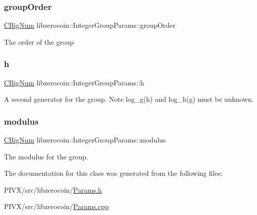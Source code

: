 \subsubsection{\texorpdfstring{group\+Order}{groupOrder}}
{\footnotesize\ttfamily \mbox{\hyperlink{class_c_big_num}{C\+Big\+Num}} libzerocoin\+::\+Integer\+Group\+Params\+::group\+Order}

The order of the group \mbox{\label{classlibzerocoin_1_1_integer_group_params_a23e945fc61cb016c144e22a1cc01e96a}} 
\subsubsection{\texorpdfstring{h}{h}}
{\footnotesize\ttfamily \mbox{\hyperlink{class_c_big_num}{C\+Big\+Num}} libzerocoin\+::\+Integer\+Group\+Params\+::h}

A second generator for the group. Note log\+\_\+g(h) and log\+\_\+h(g) must be unknown. \mbox{\label{classlibzerocoin_1_1_integer_group_params_a2bf8badb9ba3a76672fa10e375fde097}} 
\subsubsection{\texorpdfstring{modulus}{modulus}}
{\footnotesize\ttfamily \mbox{\hyperlink{class_c_big_num}{C\+Big\+Num}} libzerocoin\+::\+Integer\+Group\+Params\+::modulus}

The modulus for the group. 

The documentation for this class was generated from the following files\+:\begin{DoxyCompactItemize}
\item 
P\+I\+V\+X/src/libzerocoin/\mbox{\hyperlink{_params_8h}{Params.\+h}}\item 
P\+I\+V\+X/src/libzerocoin/\mbox{\hyperlink{_params_8cpp}{Params.\+cpp}}\end{DoxyCompactItemize}

